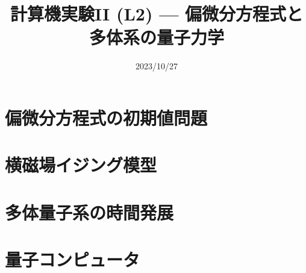 \documentclass[10pt,dvipdfmx]{beamer}
\title{計算機実験II (L2) --- 偏微分方程式と多体系の量子力学}
\date{2023/10/27}
\begin{document}
\begin{frame}
  \titlepage
  \tableofcontents
\end{frame}



\section{偏微分方程式の初期値問題}















% 
% 
% 

\section{横磁場イジング模型}





\section{多体量子系の時間発展}





\section{量子コンピュータ}





\end{document}
